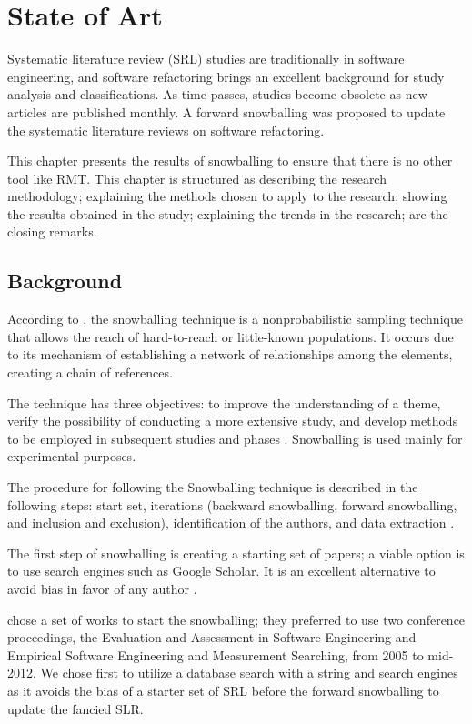 \chapter{State of Art}%
\label{chap-state}

Systematic literature review (SRL) studies are traditionally in software engineering, and software refactoring brings an excellent background for study analysis and classifications. As time passes, studies become obsolete as new articles are published monthly. A forward snowballing was proposed to update the systematic literature reviews on software refactoring.

This chapter presents the results of snowballing to ensure that there is no other tool like RMT. This chapter is structured as  describing the research methodology;  explaining the methods chosen to apply to the research;  showing the results obtained in the study;  explaining the trends in the research;  are the closing remarks.

\section{Background}
\label{sec-background}
According to \cite{benard2006}, the snowballing technique is a nonprobabilistic sampling technique that allows the reach of hard-to-reach or little-known populations. It occurs due to its mechanism of establishing a network of relationships among the elements, creating a chain of references.

The technique has three objectives: to improve the understanding of a theme, verify the possibility of conducting a more extensive study, and develop methods to be employed in subsequent studies and phases \cite{vinuto2014}. Snowballing is used mainly for experimental purposes.

The procedure for following the Snowballing technique is described in the following steps: start set, iterations (backward snowballing, forward snowballing, and inclusion and exclusion), identification of the authors, and data extraction \cite{Wohlin2014}.

The first step of snowballing is creating a starting set of papers; a viable option is to use search engines such as Google Scholar. It is an excellent alternative to avoid bias in favor of any author \cite{Wohlin2014}.

\textcite{Kitchenham2013} chose a set of works to start the snowballing; they preferred to use two conference proceedings, the Evaluation and Assessment in Software Engineering and Empirical Software Engineering and Measurement Searching, from 2005 to mid-2012. We chose first to utilize a database search with a string and search engines as it avoids the bias of a starter set of SRL before the forward snowballing to update the fancied SLR.

